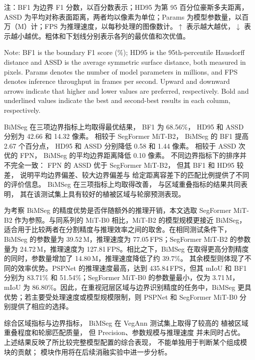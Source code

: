 \begin{table}[!htb]
\begin{minipage}{\linewidth}
    \normalfont{}\raggedright
    \noindent 注：BF1 为边界 F1 分数，以百分数表示；HD95 为第 95 百分位豪斯多夫距离，ASSD 为平均对称表面距离，两者均以像素为单位；Params 为模型参数量，以百万（M）计；FPS 为推理速度，以每秒处理的图像数计。\(\uparrow\) 表示越大越优，\(\downarrow\) 表示越小越优。粗体和下划线分别表示各列的最优值和次优值。\par
    \vspace{2pt}
    \noindent Note: BF1 is the boundary F1 score (\%); HD95 is the 95th-percentile Hausdorff distance and ASSD is the average symmetric surface distance, both measured in pixels. Params denotes the number of model parameters in millions, and FPS denotes inference throughput in frames per second. Upward and downward arrows indicate that higher and lower values are preferred, respectively. Bold and underlined values indicate the best and second-best results in each column, respectively.\par
  \end{minipage}\par
\end{table}

BiMSeg 在三项边界指标上均取得最优结果，
BF1 为 68.56\%，
HD95 和 ASSD 分别为 42.66 和 14.32 像素。
相较于 SegFormer MiT-B2，
BiMSeg 的 BF1 提高 2.67 个百分点，
HD95 和 ASSD 分别降低 0.58 和 1.44 像素。
相较于 ASSD 次优的 FPN，
BiMSeg 的平均边界距离降低 0.10 像素。
不同边界指标下的排序并不完全一致：
FPN 的 ASSD 优于 SegFormer MiT-B2，
但其 BF1 和 HD95 较差，
说明平均边界偏差、较大边界偏差与
给定距离容差下的匹配比例提供了不同的评价信息。
BiMSeg 在三项指标上均取得改善，
与区域重叠指标的结果共同表明，
其在该测试集上具有较好的植被区域与轮廓预测表现。

为考察 BiMSeg 的精度优势是否伴随额外的推理开销，本文选取 SegFormer MiT-B2 作为参照。与同系列的 MiT-B0 相比，MiT-B2 的模型规模更接近 BiMSeg，适合用于比较两者在分割精度与推理效率之间的取舍。在相同测试条件下，BiMSeg 的参数量为 39.52\,M，推理速度为 77.05\,FPS；SegFormer MiT-B2 的参数量为 24.72\,M，推理速度为 127.81\,FPS。相比之下，BiMSeg 在取得更高分割精度的同时，参数量增加了 14.80\,M，推理速度降低了约 39.7\%。
其余模型则体现了不同的效率优势。PSPNet 的推理速度最高，达到 435.84\,FPS，但其 mIoU 和 BF1 分别为 83.71\% 和 51.54\%；SegFormer MiT-B0 的参数量最小，仅为 3.71\,M，mIoU 为 86.80\%。因此，在重视冠层区域与边界识别精度的任务中，BiMSeg 更具优势；若主要受处理速度或模型规模限制，则 PSPNet 和 SegFormer MiT-B0 分别提供了相应的选择。

综合区域指标与边界指标，
BiMSeg 在 VegAnn 测试集上取得了较高的
植被区域重叠程度和轮廓匹配质量，
但 Precision、参数规模与推理速度
并未同时占优。
上述结果反映了所比较完整模型配置的综合表现，
不能单独用于判断某个组成模块的贡献；
模块作用将在后续消融实验中进一步分析。






